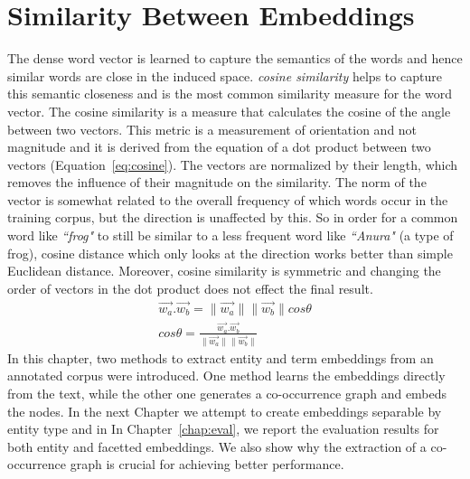 \section{Similarity Between Embeddings }\label{sec:similarity}
The dense word vector is learned to capture the semantics of the words and hence similar words are close in the induced space. \emph{cosine similarity} helps to capture this semantic closeness and is the most common similarity measure for the word vector. The cosine similarity is a measure that calculates the cosine of the angle between two vectors. This metric is a measurement of orientation and not magnitude and it is derived from the equation of a dot product between two vectors (Equation~\ref{eq:cosine}). The vectors are normalized by their length, which removes the influence of their magnitude on the similarity. The norm of the vector is somewhat related to the overall frequency of which words occur in the training corpus, but the direction is unaffected by this. So in order for a common word like \emph{``frog"} to still be similar to a less frequent word like \emph{``Anura"} (a type of frog), cosine distance which only looks at the direction works better than simple Euclidean distance. Moreover, cosine similarity is symmetric and changing the order of vectors in the dot product does not effect the final result.
\begin{equation}
\begin{split}
\overrightarrow { w_a } .\overrightarrow { w_b } =\parallel \overrightarrow { w_a } \parallel \parallel \overrightarrow { w_b } \parallel cos\theta 
\\
cos\theta =\frac { \overrightarrow { w_a } .\overrightarrow { w_b }  }{ \parallel \overrightarrow { w_a } \parallel \parallel \overrightarrow { w_b } \parallel  } 
\end{split}
\label{eq:cosine}
\end{equation}
\noindent
In this chapter,  two methods to extract entity and term embeddings from an annotated corpus were introduced. One method learns the embeddings directly from the text, while the other one generates a co-occurrence graph and embeds the nodes. In the next Chapter we attempt to create embeddings separable by entity type and in In Chapter~\ref{chap:eval}, we report the evaluation results for both entity and facetted embeddings. We also show why the extraction of a co-occurrence graph is crucial for achieving better performance. 

